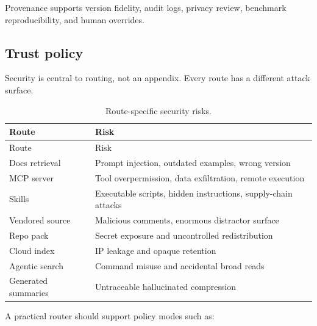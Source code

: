 \documentclass[
  11pt,
  letterpaper,
  numbers=noendperiod,
  parskip=half]{scrartcl}
\begin{document}
Provenance supports version fidelity, audit logs, privacy review,
benchmark reproducibility, and human overrides.

\subsection{Trust policy}\label{sec-security}

Security is central to routing, not an appendix. Every route has a
different attack surface.

\begin{longtable}[]{@{}
  >{\raggedright\arraybackslash}p{}
  >{\raggedright\arraybackslash}p{}@{}}
\caption{Route-specific security
risks.}\label{tbl-security}\tabularnewline
\toprule\noalign{}
\begin{minipage}[b]{\linewidth}\raggedright
Route
\end{minipage} & \begin{minipage}[b]{\linewidth}\raggedright
Risk
\end{minipage} \\
\midrule\noalign{}
\endfirsthead
\toprule\noalign{}
\begin{minipage}[b]{\linewidth}\raggedright
Route
\end{minipage} & \begin{minipage}[b]{\linewidth}\raggedright
Risk
\end{minipage} \\
\midrule\noalign{}
\endhead
\bottomrule\noalign{}
\endlastfoot
Docs retrieval & Prompt injection, outdated examples, wrong version \\
MCP server & Tool overpermission, data exfiltration, remote execution \\
Skills & Executable scripts, hidden instructions, supply-chain
attacks \\
Vendored source & Malicious comments, enormous distractor surface \\
Repo pack & Secret exposure and uncontrolled redistribution \\
Cloud index & IP leakage and opaque retention \\
Agentic search & Command misuse and accidental broad reads \\
Generated summaries & Untraceable hallucinated compression \\
\end{longtable}

A practical router should support policy modes such as:
\end{document}

